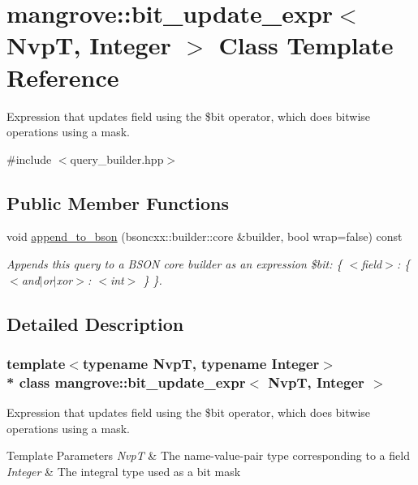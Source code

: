 \hypertarget{classmangrove_1_1bit__update__expr}{}\section{mangrove\+:\+:bit\+\_\+update\+\_\+expr$<$ NvpT, Integer $>$ Class Template Reference}
\label{classmangrove_1_1bit__update__expr}


Expression that updates field using the \$bit operator, which does bitwise operations using a mask.  




{\ttfamily \#include $<$query\+\_\+builder.\+hpp$>$}

\subsection*{Public Member Functions}
\begin{DoxyCompactItemize}
\item 
void \hyperlink{classmangrove_1_1bit__update__expr_a9c0818c6e63917c8712476b604c212d7}{append\+\_\+to\+\_\+bson} (bsoncxx\+::builder\+::core \&builder, bool wrap=false) const 
\begin{DoxyCompactList}\small\item\em Appends this query to a B\+S\+ON core builder as an expression \textquotesingle{}\$bit\+: \{ $<$field$>$\+: \{ $<$and$\vert$or$\vert$xor$>$\+: $<$int$>$ \} \}\textquotesingle{}. \end{DoxyCompactList}\end{DoxyCompactItemize}


\subsection{Detailed Description}
\subsubsection*{template$<$typename NvpT, typename Integer$>$\\*
class mangrove\+::bit\+\_\+update\+\_\+expr$<$ Nvp\+T, Integer $>$}

Expression that updates field using the \$bit operator, which does bitwise operations using a mask. 


\begin{DoxyTemplParams}{Template Parameters}
{\em NvpT} & The name-\/value-\/pair type corresponding to a field \\
\hline
{\em Integer} & The integral type used as a bit mask \\
\hline
\end{DoxyTemplParams}


